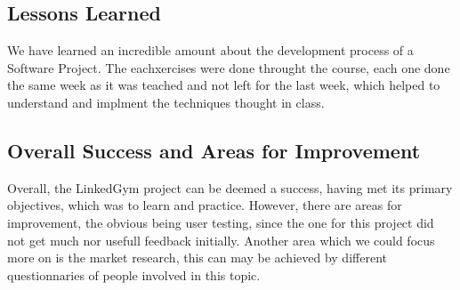 \subsection{Lessons Learned}
We have learned an incredible amount about the development process of a Software Project. The eachxercises were done throught the course, each one done the same week as it was teached and not left for the last week, which helped to understand and implment the techniques thought in class.

\subsection{Overall Success and Areas for Improvement}
Overall, the LinkedGym project can be deemed a success, having met its primary objectives, which was to learn and practice. However, there are areas for improvement, the obvious being user testing, since the one for this project did not get much nor usefull feedback initially. Another area which we could focus more on is the market research, this can may be achieved by different questionnaries of people involved in this topic.

\clearpage